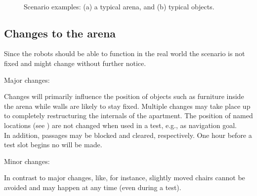 \begin{figure}[tbp]
	\centering
	 ~ 
	\caption{Scenario examples: (a) a typical arena, and (b) typical objects.}
	\label{fig:arena}
\end{figure}



\subsection{Changes to the arena}
\label{rule:scenario_changes}

Since the robots should be able to function in the real world the scenario is not fixed and might change without further notice.
\begin{enumerate}
	{\bf\item Major changes:} Changes will primarily influence the position of objects such as furniture inside the arena while walls are likely to stay fixed. Multiple changes may take place up to completely restructuring the internals of the apartment. The position of named locations (see ) are not changed when used in a test, e.g., as navigation goal. \\
	In addition, passages may be blocked and cleared, respectively. One hour before a test slot begins no  will be made.

	{\bf\item Minor changes:} In contrast to major changes,  like, for instance, slightly moved chairs cannot be avoided and may happen at any time (even during a test). 
\end{enumerate}



